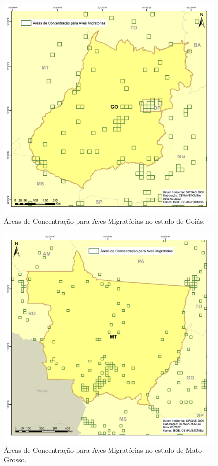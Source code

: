 \documentclass[
  oneside]{scrbook}
\begin{document}
\begin{figure}[H]

{\centering \includegraphics[width=0.75\linewidth]{imagens/cap07/Figura_7.32_GO} 

}

\caption{Áreas de Concentração para Aves Migratórias no estado de Goiás.}\label{fig:52}
\end{figure}

\begin{figure}[H]

{\centering \includegraphics[width=0.75\linewidth]{imagens/cap07/Figura_7.33_MT} 

}

\caption{Áreas de Concentração para Aves Migratórias no estado de Mato Grosso.}\label{fig:53}
\end{figure}
\end{document}
